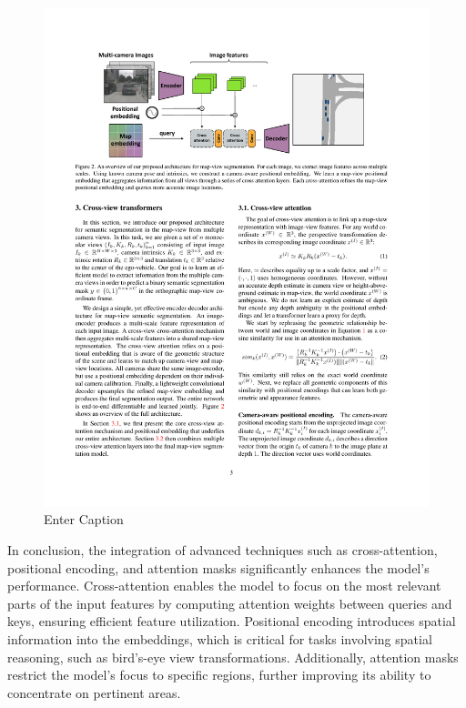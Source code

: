 \begin{figure}[H]
    \centering
    \includegraphics[width=1\linewidth]{LateX//figs/2205.02833v1.pdf}
    \caption{Enter Caption \cite{zhou2022crossviewtransformersrealtimemapview}}
    \label{fig:bev-transformer}
\end{figure}

In conclusion, the integration of advanced techniques such as cross-attention, positional encoding, and attention masks significantly enhances the model's performance. Cross-attention enables the model to focus on the most relevant parts of the input features by computing attention weights between queries and keys, ensuring efficient feature utilization. Positional encoding introduces spatial information into the embeddings, which is critical for tasks involving spatial reasoning, such as bird’s-eye view transformations. Additionally, attention masks restrict the model's focus to specific regions, further improving its ability to concentrate on pertinent areas.

